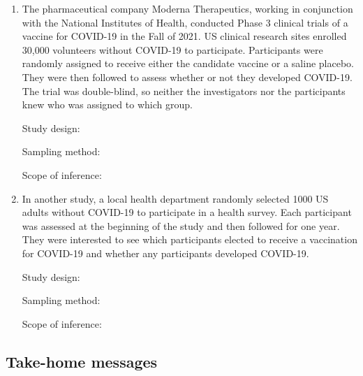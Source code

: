 \documentclass[
]{report}
\begin{document}
\begin{enumerate}
\def\labelenumi{\arabic{enumi}.}
\setcounter{enumi}{14}
\item
  The pharmaceutical company Moderna Therapeutics, working in conjunction with the National Institutes of Health, conducted Phase 3 clinical trials of a vaccine for COVID-19 in the Fall of 2021. US clinical research sites enrolled 30,000 volunteers without COVID-19 to participate. Participants were randomly assigned to receive either the candidate vaccine or a saline placebo. They were then followed to assess whether or not they developed COVID-19. The trial was double-blind, so neither the investigators nor the participants knew who was assigned to which group.
  \vspace{0.1in}

  Study design:
  \vspace{0.3in}

  Sampling method:
  \vspace{0.3in}

  Scope of inference:
  \newpage
\item
  In another study, a local health department randomly selected 1000 US adults without COVID-19 to participate in a health survey. Each participant was assessed at the beginning of the study and then followed for one year. They were interested to see which participants elected to receive a vaccination for COVID-19 and whether any participants developed COVID-19.
  \vspace{0.1in}

  Study design:
  \vspace{0.3in}

  Sampling method:
  \vspace{0.3in}

  Scope of inference:
  \vspace{0.3in}
\end{enumerate}

\subsection{Take-home messages}\label{take-home-messages-15}
\end{document}
